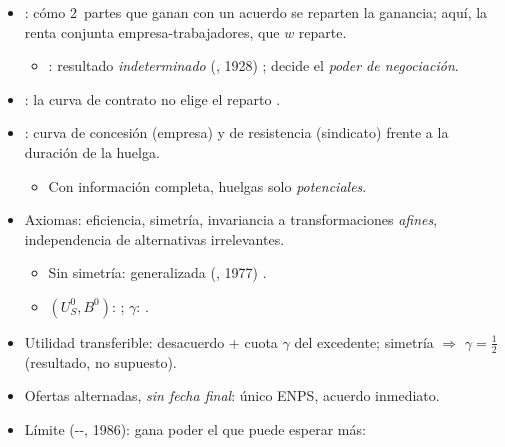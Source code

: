 \documentclass{article}
\begin{document}
\begin{columnas}
\begin{itemize}
\item {}: cómo 2~partes que ganan con un acuerdo se reparten la ganancia; aquí, la renta conjunta empresa-trabajadores, que $w$ reparte.
  \begin{itemize}
  \item {}: resultado \emph{indeterminado} (, 1928) ; decide el \emph{poder de negociación}.
  \end{itemize}
\end{itemize}
\begin{itemize}
\item {}: la curva de contrato no elige el reparto .
\item {}: curva de concesión (empresa) y de resistencia (sindicato) frente a la duración de la huelga.
  \begin{itemize}
  \item Con información completa, huelgas solo \emph{potenciales}.
  \end{itemize}
\end{itemize}
\begin{itemize}
\item Axiomas: eficiencia, simetría, invariancia a transformaciones \emph{afines}, independencia de alternativas irrelevantes.
  \begin{itemize}
  \item Sin simetría:  generalizada (, 1977) .
  \item $(U_S^0,B^0)$: ; $\gamma$: .
  \end{itemize}
\item Utilidad transferible: desacuerdo + cuota $\gamma$ del excedente; simetría $\Rightarrow$ $\gamma=\tfrac12$ (resultado, no supuesto).
\end{itemize}
\begin{itemize}
\item Ofertas alternadas, \emph{sin fecha final}: único ENPS, acuerdo inmediato.
\item Límite (--, 1986): gana poder el que puede esperar más:

\end{itemize}
\end{columnas}
\end{document}
